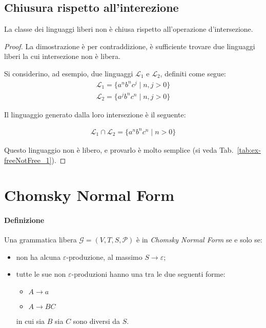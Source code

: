 \documentclass[class=book, crop=false, oneside, 12pt]{standalone}
\begin{document}
\subsection*{Chiusura rispetto all'interezione}

\begin{lemma}
  La classe dei linguaggi liberi non è chiusa rispetto all'operazione d'intersezione.
\end{lemma}

\begin{proof}
  La dimostrazione è per contraddizione, è sufficiente trovare due linguaggi liberi la cui intersezione non è libera.

  Si considerino, ad esempio, due linguaggi \(\mathcal{L}_1\) e \(\mathcal{L}_2\), definiti come segue:
  \begin{align*}
      \mathcal{L}_1 = \{a^n b^n c^j \mid n, j > 0 \} \\
      \mathcal{L}_2 = \{a^j b^n c^n \mid n, j > 0 \}
  \end{align*}

  \noindent Il linguaggio generato dalla loro intersezione è il seguente:

  \begin{align*}
    \mathcal{L}_1 \cap \mathcal{L}_2 = \{ a^n b^n c^n \mid n > 0 \}
  \end{align*}

  \noindent Questo linguaggio non è libero, e provarlo è molto semplice (si veda Tab.~\ref{tab:ex-freeNotFree_1}).

\end{proof}

\section{Chomsky Normal Form}
\paragraph{Definizione}
Una grammatica libera \(\mathcal{G} = (V, T, S, \mathcal{P})\) è in \emph{Chomsky Normal Form} se e solo se:
\begin{itemize}
  \item non ha alcuna \(\varepsilon\)-produzione, al massimo \(S \rightarrow \varepsilon\);
  \item tutte le sue non \(\varepsilon\)-produzioni hanno una tra le due seguenti forme:
  \begin{itemize}
    \item \(A \rightarrow a\)
    \item \(A \rightarrow BC\)
  \end{itemize}
  in cui sia \(B\) sia \(C\) sono diversi da \(S\).
\end{itemize}
\end{document}
